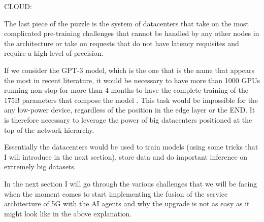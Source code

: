 \bigskip
\noindent
CLOUD:
\label{ssec:cloud}

The last piece of the puzzle is the system of datacenters that take on the most complicated pre-training challenges that cannot be handled by any other nodes in the architecture or take on
requests that do not have latency requisites and require a high level of precision.

If we consider the GPT-3 model, which is the one that is the name that appears the most in recent literature, it would be necessary to have more than 1000 GPUs running non-stop for more than
4 months to have the complete training of the 175B parameters that compose the model \cite{gaisnet}.
This task would be impossible for the any low-power device, regardless of the position in the edge
layer or the END. It is therefore necessary to leverage the power of big datacenters positioned at
the top of the network hierarchy.

Essentially the datacenters would be used to train models (using some tricks that I will introduce
in the next section), store data and do important inference on extremely big datasets.

\bigskip

In the next section I will go through the various challenges that we will be facing when the moment
comes to start implementing the fusion of the service architecture of 5G with the AI agents and why
the upgrade is not as easy as it might look like in the above explanation.
